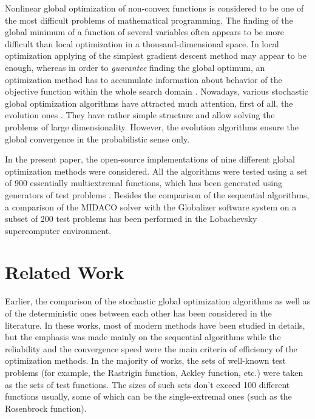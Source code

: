 \documentclass{svproc}
\begin{document}
Nonlinear global optimization of non-convex functions is considered to be one of the most
difficult problems of mathematical programming. The finding of the global minimum of
a function of several variables often appears to be more difficult than local optimization in a
thousand-dimensional space. In local optimization applying of the simplest gradient descent
method may appear to be enough, whereas in order to \textit{guarantee} finding the global
optimum, an optimization method has to accumulate information about behavior of the
objective function within the whole search domain
\cite{Jones2009,Paulavicius2011,Evtushenko2013,strSergGO}. Nowadays, various stochastic global
optimization algorithms have attracted much attention, first of all, the evolution ones
\cite{Storn1997, SCHLUTER2009, KennedyEberhart1995}. They have rather simple structure
and allow solving the problems of large dimensionality. However, the evolution algorithms ensure
the global convergence in the probabilistic sense only.

In the present paper, the open-source implementations of nine different global optimization methods
were considered. All the algorithms were tested using a set of 900 essentially multiextremal functions,
which has been generated using generators of test problems \cite{Gaviano2003, grishaginClass}.
Besides the comparison of the sequential algorithms, a comparison of the MIDACO solver
\cite{Schlueter2012} with the Globalizer software system \cite{globalizerSystem,Strongin2018} on a subset of 200 test problems has been
performed in the Lobachevsky supercomputer environment.


\section{Related Work}

Earlier, the comparison of the stochastic global optimization algorithms \cite{Ali2005, JSSv060i06}
as well as of the deterministic ones \cite{posik2012, KVASOV2018245, Liberti2005} between each
other has been considered in the literature. In these works, most of modern methods have
been studied in details, but the emphasis was made mainly on the sequential algorithms while the
reliability and the convergence speed were the main criteria of efficiency of the optimization
methods. In the majority of works, the sets of well-known test problems (for example, the Rastrigin
function, Ackley function, etc.) were taken as the sets of test functions. The sizes of such sets don't
exceed 100 different functions usually, some of which can be the single-extremal ones (such as the
Rosenbrock function).
\end{document}
